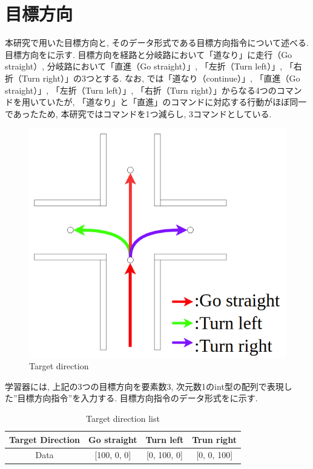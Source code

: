 
\section{目標方向}
本研究で用いた目標方向と, そのデータ形式である目標方向指令について述べる. 目標方向をに示す. 目標方向を経路と分岐路において「道なり」に走行（Go straight）, 分岐路において「直進（Go straight）」, 「左折（Turn left）」, 「右折（Turn right）」の3つとする. なお, \cite{mech}では「道なり（continue）」, 「直進（Go straight）」, 「左折（Turn left）」, 「右折（Turn right）」からなる4つのコマンドを用いていたが, 「道なり」と「直進」のコマンドに対応する行動がほぼ同一であったため, 本研究ではコマンドを1つ減らし, 3コマンドとしている.

\begin{figure}[hbtp]
  \centering
 \includegraphics[keepaspectratio, scale=0.38]
      {images/direction.png}
 \caption{Target direction}
 \label{Fig:direction}
\end{figure}

学習器には, 上記の3つの目標方向を要素数3, 次元数1のint型の配列で表現した”目標方向指令”を入力する. 目標方向指令のデータ形式をに示す.

\begin{table}[hbtp]
  \caption{Target direction list}
  \label{table:direction}
  \centering
  \begin{tabular}{|c|c|c|c|}
    \hline
    Target Direction  & Go straight & Turn left & Trun right\\
    \hline
    Data & [100, 0, 0] & [0, 100, 0] & [0, 0, 100]\\
    \hline
  \end{tabular}
\end{table}


\newpage
